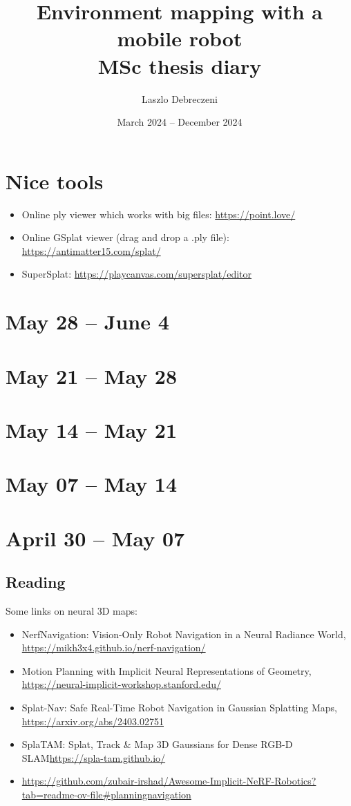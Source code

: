 \documentclass{article}
\title{Environment mapping with a mobile robot \\
\Large MSc thesis diary}
\author{Laszlo Debreczeni}
\date{March 2024 -- December 2024}
\begin{document}
\maketitle

\tableofcontents
\newpage

\section{Nice tools}
\begin{itemize}
    \item Online ply viewer which works with big files: \url{https://point.love/}
    \item Online GSplat viewer (drag and drop a .ply file): \url{https://antimatter15.com/splat/}
    \item SuperSplat: \url{https://playcanvas.com/supersplat/editor}
\end{itemize}

\section{May 28 -- June 4}
\section{May 21 -- May 28}
\section{May 14 -- May 21}
\section{May 07 -- May 14}
\newpage

\section{April 30 -- May 07}
\subsection{Reading}
Some links on neural 3D maps:
\begin{itemize}
\item NerfNavigation: Vision-Only Robot Navigation in a Neural Radiance World, \url{https://mikh3x4.github.io/nerf-navigation/}
\item Motion Planning with Implicit Neural Representations of Geometry, \url{https://neural-implicit-workshop.stanford.edu/}
\item Splat-Nav: Safe Real-Time Robot Navigation in Gaussian Splatting Maps, \url{https://arxiv.org/abs/2403.02751}
\item SplaTAM: Splat, Track \& Map 3D Gaussians for Dense RGB-D SLAM\url{https://spla-tam.github.io/}
\item \url{https://github.com/zubair-irshad/Awesome-Implicit-NeRF-Robotics?tab=readme-ov-file#planningnavigation}
\end{itemize}
\newpage
\end{document}

